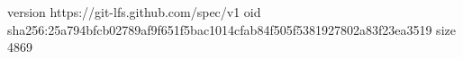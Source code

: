 version https://git-lfs.github.com/spec/v1
oid sha256:25a794bfcb02789af9f651f5bac1014cfab84f505f5381927802a83f23ea3519
size 4869
